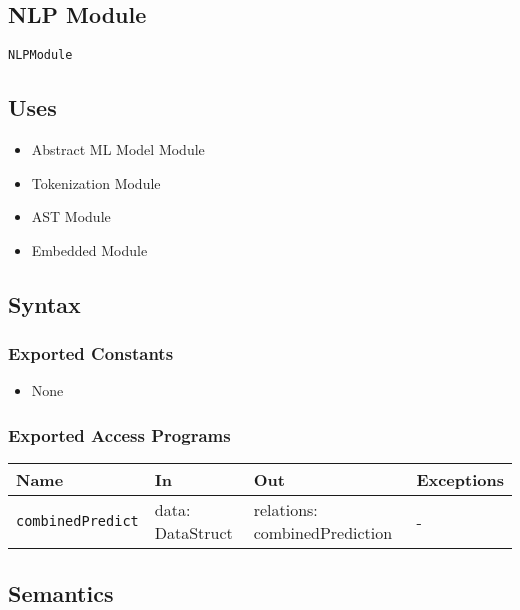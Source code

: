 \documentclass[12pt, titlepage]{article}
\begin{document}

\subsection{NLP Module}  \label{NLPModule}

\texttt{NLPModule}

\subsection{Uses}

\begin{itemize}
    \item Abstract ML Model Module
    \item Tokenization Module
    \item AST Module
    \item Embedded Module
\end{itemize}

\subsection{Syntax}

\subsubsection{Exported Constants}

\begin{itemize}
    \item None
\end{itemize}

\subsubsection{Exported Access Programs}

\begin{center}
\begin{tabular}{p{5cm} p{3.5cm} p{3.5cm} p{2cm}}
\hline
\textbf{Name} & \textbf{In} & \textbf{Out} & \textbf{Exceptions} \\
\hline
\texttt{combinedPredict} & data: DataStruct & relations: combinedPrediction & -\\
\hline
\end{tabular}
\end{center}

\subsection{Semantics}
\end{document}
